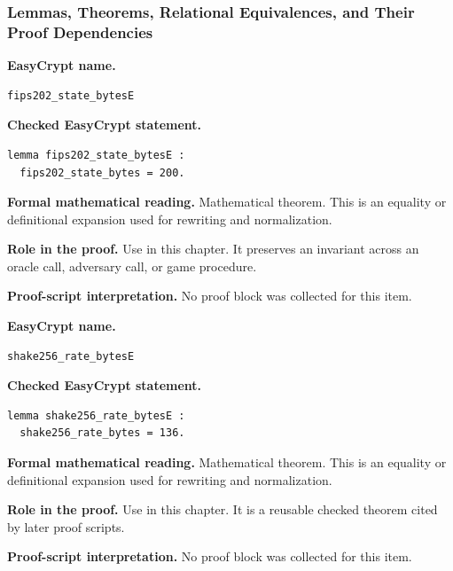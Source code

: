 \subsubsection*{Lemmas, Theorems, Relational Equivalences, and Their Proof Dependencies}
\begin{formaltheorem}
\noindent\textbf{EasyCrypt name.}
\begin{lstlisting}[language=EasyCrypt,basicstyle=\ttfamily\scriptsize]
fips202_state_bytesE
\end{lstlisting}
\noindent\textbf{Checked EasyCrypt statement.}
\begin{lstlisting}[language=EasyCrypt,basicstyle=\ttfamily\scriptsize]
lemma fips202_state_bytesE :
  fips202_state_bytes = 200.
\end{lstlisting}
\noindent\textbf{Formal mathematical reading.}
Mathematical theorem. This is an equality or definitional expansion used for rewriting and normalization.

\noindent\textbf{Role in the proof.}
Use in this chapter. It preserves an invariant across an oracle call, adversary call, or game procedure.

\noindent\textbf{Proof-script interpretation.}
No proof block was collected for this item.

\end{formaltheorem}

\begin{formaltheorem}
\noindent\textbf{EasyCrypt name.}
\begin{lstlisting}[language=EasyCrypt,basicstyle=\ttfamily\scriptsize]
shake256_rate_bytesE
\end{lstlisting}
\noindent\textbf{Checked EasyCrypt statement.}
\begin{lstlisting}[language=EasyCrypt,basicstyle=\ttfamily\scriptsize]
lemma shake256_rate_bytesE :
  shake256_rate_bytes = 136.
\end{lstlisting}
\noindent\textbf{Formal mathematical reading.}
Mathematical theorem. This is an equality or definitional expansion used for rewriting and normalization.

\noindent\textbf{Role in the proof.}
Use in this chapter. It is a reusable checked theorem cited by later proof scripts.

\noindent\textbf{Proof-script interpretation.}
No proof block was collected for this item.

\end{formaltheorem}

